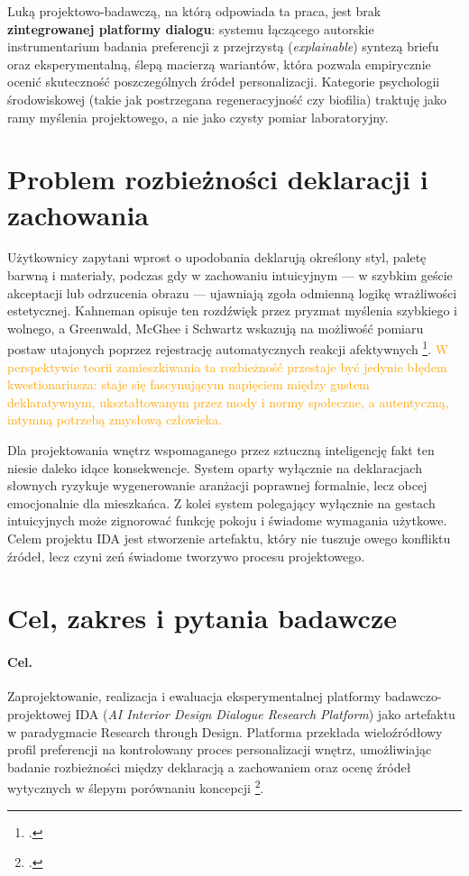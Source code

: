 Luką projektowo-badawczą, na którą odpowiada ta praca, jest brak \textbf{zintegrowanej platformy dialogu}: systemu łączącego autorskie instrumentarium badania preferencji z przejrzystą (\emph{explainable}) syntezą briefu oraz eksperymentalną, ślepą macierzą wariantów, która pozwala empirycznie ocenić skuteczność poszczególnych źródeł personalizacji.
Kategorie psychologii środowiskowej (takie jak postrzegana regeneracyjność czy biofilia) traktuję jako ramy myślenia projektowego, a nie jako czysty pomiar laboratoryjny.

\section{Problem rozbieżności deklaracji i zachowania}
\label{ch01:sec:problem}

Użytkownicy zapytani wprost o upodobania deklarują określony styl, paletę barwną i materiały, podczas gdy w zachowaniu intuicyjnym --- w szybkim geście akceptacji lub odrzucenia obrazu --- ujawniają zgoła odmienną logikę wrażliwości estetycznej.
Kahneman opisuje ten rozdźwięk przez pryzmat myślenia szybkiego i wolnego, a Greenwald, McGhee i Schwartz wskazują na możliwość pomiaru postaw utajonych poprzez rejestrację automatycznych reakcji afektywnych \footcite{kahneman2011thinking,greenwald1998iat}.
\textcolor{orange}{W perspektywie teorii zamieszkiwania ta rozbieżność przestaje być jedynie błędem kwestionariusza: staje się fascynującym napięciem między gustem deklaratywnym, ukształtowanym przez mody i normy społeczne, a autentyczną, intymną potrzebą zmysłową człowieka.}

Dla projektowania wnętrz wspomaganego przez sztuczną inteligencję fakt ten niesie daleko idące konsekwencje. System oparty wyłącznie na deklaracjach słownych ryzykuje wygenerowanie aranżacji poprawnej formalnie, lecz obcej emocjonalnie dla mieszkańca. Z kolei system polegający wyłącznie na gestach intuicyjnych może zignorować funkcję pokoju i świadome wymagania użytkowe.
Celem projektu IDA jest stworzenie artefaktu, który nie tuszuje owego konfliktu źródeł, lecz czyni zeń świadome tworzywo procesu projektowego.

\section{Cel, zakres i pytania badawcze}
\label{ch01:sec:cel}

\paragraph{Cel.}
Zaprojektowanie, realizacja i ewaluacja eksperymentalnej platformy badawczo-projektowej IDA (\emph{AI Interior Design Dialogue Research Platform}) jako artefaktu w paradygmacie Research through Design. Platforma przekłada wieloźródłowy profil preferencji na kontrolowany proces personalizacji wnętrz, umożliwiając badanie rozbieżności między deklaracją a zachowaniem oraz ocenę źródeł wytycznych w ślepym porównaniu koncepcji \footcite{idaPlatform2026}.

